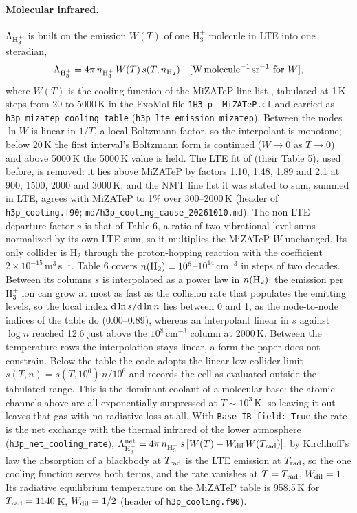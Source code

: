 \paragraph{Molecular infrared.} $\Lambda_{\rm H_3^+}$ is built on the
emission $W(T)$ of one H$_3^+$ molecule in LTE into one steradian,
\begin{equation}
\Lambda_{\rm H_3^+} = 4\pi\,n_{\rm H_3^+}\,W(T)\,s(T,n_{\rm H_2})
\quad \mathrm{[W\,molecule^{-1}\,sr^{-1}\ for\ }W\mathrm{]},
\label{eq:th:h3p}
\end{equation}
where $W(T)$ is the cooling function of the MiZATeP line list
\citep[][section 5 and Table 7]{Mizus2017}, tabulated at 1\,K steps from
20 to 5000\,K in the ExoMol file \texttt{1H3\_p\_\_MiZATeP.cf} and carried as
\texttt{h3p\_mizatep\_cooling\_table} (\texttt{h3p\_lte\_emission\_mizatep}).
Between the nodes $\ln W$ is linear in $1/T$, a local Boltzmann factor, so
the interpolant is monotone; below 20\,K the first interval's Boltzmann form
is continued ($W\to0$ as $T\to0$) and above 5000\,K the 5000\,K value is
held. The LTE fit of \citet{Miller2013} (their Table 5), used before, is
removed: it lies above MiZATeP by factors 1.10, 1.48, 1.89 and 2.1 at 900,
1500, 2000 and 3000\,K, and the NMT line list it was stated to sum, summed
in LTE, agrees with MiZATeP to 1\% over 300--2000\,K (header of
\texttt{h3p\_cooling.f90}; \texttt{md/h3p\_cooling\_cause\_20261010.md}).
The non-LTE departure
factor $s$ is that of \citet{Miller2013} Table 6, a ratio of two
vibrational-level sums normalized by its own LTE sum, so it multiplies
the MiZATeP $W$ unchanged. Its only collider is H$_2$ through the
proton-hopping reaction with the \citet{Oka2004} coefficient
$2\times10^{-15}$\,m$^{3}$\,s$^{-1}$. Table 6 covers
$n({\rm H_2}) = 10^{6}$--$10^{14}$\,cm$^{-3}$ in steps of two decades.
Between its columns $s$ is interpolated as a power law in $n({\rm H_2})$:
the emission per H$_3^+$ ion can grow at most as fast as the collision rate
that populates the emitting levels, so the local index ${\rm d}\ln s/{\rm
d}\ln n$ lies between 0 and 1, as the node-to-node indices of the table do
(0.00--0.89), whereas an interpolant linear in $s$ against $\log n$ reached
12.6 just above the $10^{8}$\,cm$^{-3}$ column at 2000\,K. Between the
temperature rows the interpolation stays linear, a form the paper does not
constrain. Below the table the code adopts
the linear low-collider limit $s(T,n) = s(T,10^{6})\,n/10^{6}$ and records
the cell as evaluated outside the tabulated range. This is the dominant
coolant of a molecular base: the atomic channels above are all exponentially
suppressed at $T\sim10^{3}$\,K, so leaving it out leaves that gas with no
radiative loss at all. With \texttt{Base IR field: True} the rate is the net
exchange with the thermal infrared of the lower atmosphere
(\texttt{h3p\_net\_cooling\_rate}),
$\Lambda^{\rm net}_{\rm H_3^+} = 4\pi\,n_{\rm H_3^+}\,s\,[W(T)-W_{\rm dil}\,W(T_{\rm rad})]$:
by Kirchhoff's law the absorption of a blackbody at $T_{\rm rad}$ is the
LTE emission at $T_{\rm rad}$, so the one cooling function serves both terms,
and the rate vanishes at $T=T_{\rm rad}$, $W_{\rm dil}=1$. Its radiative
equilibrium temperature on the MiZATeP table is 958.5\,K for
$T_{\rm rad}=1140$\,K, $W_{\rm dil}=1/2$ (header of \texttt{h3p\_cooling.f90}).

